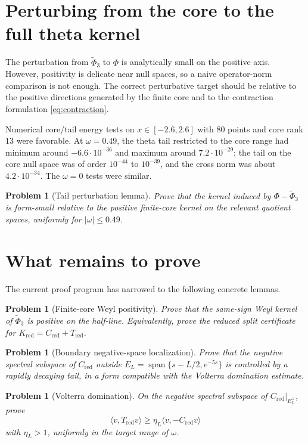\documentclass[11pt]{article}
\newtheorem{problem}[theorem]{Problem}
\newcommand{\Span}{\operatorname{span}}
\newcommand{\Kred}{K_{\mathrm{red}}}
\newcommand{\Cred}{C_{\mathrm{red}}}
\newcommand{\Tred}{T_{\mathrm{red}}}
\newcommand{\EL}{E_L}
\begin{document}
\section{Perturbing from the core to the full theta kernel}

The perturbation from $\widetilde\Phi_3$ to $\Phi$ is analytically small on
the positive axis.  However, positivity is delicate near null spaces, so a
naive operator-norm comparison is not enough.  The correct perturbative target
should be relative to the positive directions generated by the finite core and
to the contraction formulation \eqref{eq:contraction}.

Numerical core/tail energy tests on $x\in[-2.6,2.6]$ with $80$ points and
core rank $13$ were favorable.  At $\omega=0.49$, the theta tail restricted to
the core range had minimum around $-6.6\cdot 10^{-36}$ and maximum around
$7.2\cdot 10^{-29}$; the tail on the core null space was of order
$10^{-44}$ to $10^{-39}$, and the cross norm was about $4.2\cdot 10^{-34}$.
The $\omega=0$ tests were similar.

\begin{problem}[Tail perturbation lemma]
Prove that the kernel induced by $\Phi-\widetilde\Phi_3$ is form-small
relative to the positive finite-core kernel on the relevant quotient spaces,
uniformly for $|\omega|\le 0.49$.
\end{problem}

\section{What remains to prove}

The current proof program has narrowed to the following concrete lemmas.

\begin{problem}[Finite-core Weyl positivity]
Prove that the same-sign Weyl kernel of $\widetilde\Phi_3$ is positive on the
half-line.  Equivalently, prove the reduced split certificate for
$\Kred=\Cred+\Tred$.
\end{problem}

\begin{problem}[Boundary negative-space localization]
Prove that the negative spectral subspace of $\Cred$ outside
$\EL=\Span\{s-L/2,e^{-5s}\}$ is controlled by a rapidly decaying tail, in a
form compatible with the Volterra domination estimate.
\end{problem}

\begin{problem}[Volterra domination]
On the negative spectral subspace of $\Cred|_{\EL^\perp}$, prove
\[
  \langle v,\Tred v\rangle
   \ge \eta_L\langle v,-\Cred v\rangle
\]
with $\eta_L>1$, uniformly in the target range of $\omega$.
\end{problem}
\end{document}
